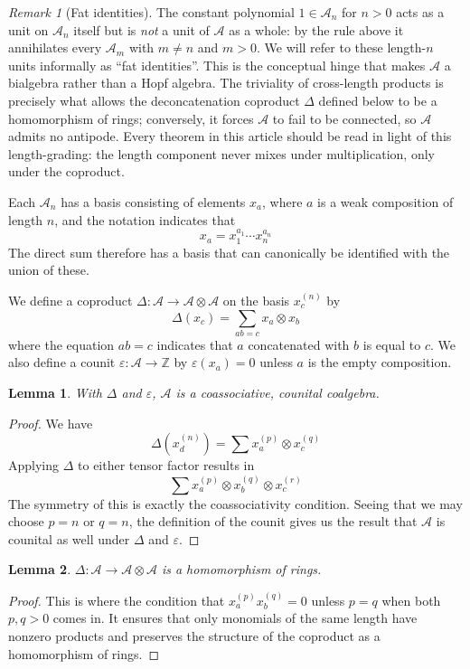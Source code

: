 \documentclass{amsart}
\newtheorem{lemma}{Lemma}[subsection]
\theoremstyle{definition}
\theoremstyle{remark}
\newtheorem*{remark}{Remark}
\numberwithin{equation}{subsection}
\newcommand{\coma}{\mathcal{A}}
\begin{document}
\begin{remark}[Fat identities]\label{remark:fatidentity}
The constant polynomial $1\in\coma_n$ for $n>0$ acts as a unit on $\coma_n$ itself but is \emph{not} a unit of $\coma$ as a whole: by the rule above it annihilates every $\coma_m$ with $m\neq n$ and $m>0$. We will refer to these length-$n$ units informally as ``fat identities''. This is the conceptual hinge that makes $\coma$ a bialgebra rather than a Hopf algebra. The triviality of cross-length products is precisely what allows the deconcatenation coproduct $\Delta$ defined below to be a homomorphism of rings; conversely, it forces $\coma$ to fail to be connected, so $\coma$ admits no antipode. Every theorem in this article should be read in light of this length-grading: the length component never mixes under multiplication, only under the coproduct.
\end{remark}

Each $\coma_n$ has a basis consisting of elements $x_a$, where $a$ is a weak composition of length $n$, and the notation indicates that
$$x_a = x_1^{a_1}\cdots x_n^{a_n}$$
The direct sum therefore has a basis that can canonically be identified with the union of these.

We define a coproduct $\Delta:\coma\to\coma\otimes\coma$ on the basis $x_c^{(n)}$ by
$$\Delta(x_c) = \sum_{ab=c} x_a\otimes x_b$$
where the equation $ab=c$ indicates that $a$ concatenated with $b$ is equal to $c$. We also define a counit $\varepsilon:\coma\to \mathbb{Z}$ by $\varepsilon(x_a)=0$ unless $a$ is the empty composition.

\begin{lemma}
	With $\Delta$ and $\varepsilon$, $\coma$ is a coassociative, counital coalgebra.
\end{lemma}
\begin{proof}
	We have 
	$$\Delta(x_d^{(n)})=\sum x_a^{(p)}\otimes x_c^{(q)}$$
	Applying $\Delta$ to either tensor factor results in
	$$\sum x_a^{(p)}\otimes x_b^{(q)}\otimes x_c^{(r)}$$
	The symmetry of this is exactly the coassociativity condition. Seeing that we may choose $p=n$ or $q=n$, the definition of the counit gives us the result that $\coma$ is counital as well under $\Delta$ and $\varepsilon$.
\end{proof}

\begin{lemma}
	$\Delta:\coma\to\coma\otimes\coma$ is a homomorphism of rings.
\end{lemma}
\begin{proof}
	This is where the condition that $x_a^{(p)}x_b^{(q)}=0$ unless $p=q$ when both $p,q>0$ comes in. It ensures that only monomials of the same length have nonzero products and preserves the structure of the coproduct as a homomorphism of rings.
\end{proof}
\end{document}
